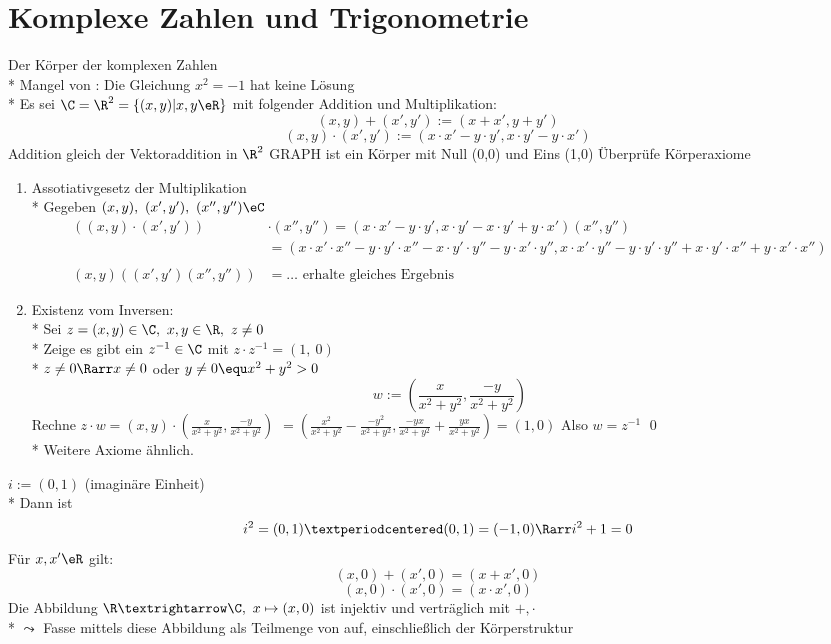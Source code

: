\chapter{Komplexe Zahlen und Trigonometrie}
Der Körper \C{} der komplexen Zahlen\\*
Mangel von \R{}: Die Gleichung $x^2=-1$ hat keine Lösung\\*
Es sei $\C=\R^2=\{(x,y)|x,y\eR\}$ mit folgender Addition und Multiplikation:
$$(x,y)+(x',y'):=(x+x',y+y')$$
$$(x,y)·(x',y'):=(x·x'-y·y',x·y'-y·x')$$
Addition gleich der Vektoraddition in $\R^2$ GRAPH
\C{} ist ein Körper mit Null (0,0) und Eins (1,0)
\bew
Überprüfe Körperaxiome
\begin{enumerate}
\item{Assotiativgesetz der Multiplikation\\*
Gegeben $(x,y),\ (x',y'),\ (x'',y'')\eC$
\begin{align*}
((x,y)·(x',y'))&·(x'',y'')=(x·x'-y·y',x·y'-x·y'+y·x')(x'',y'')\\
&=(x·x'·x''-y·y'·x''-x·y'·y''-y·x'·y'',x·x'·y''-y·y'·y''+x·y'·x''+y·x'·x'')\\ \\
(x,y)((x',y')(x'',y''))&=…\text{ erhalte gleiches Ergebnis}
\end{align*}}

\item{Existenz vom Inversen:\\*
Sei $z = (x, y) \in \C, \ x, y \in \R, \ z \neq 0$ \\*
Zeige es gibt ein $z^{-1} \in \C$ mit $z \cdot z^{-1} = (1,\ 0)$\\*
$z \neq 0 \Rarr x \neq 0$ oder $y \neq 0 \equ x^2 + y^2 > 0$\\
$$w:= \left(\frac{x}{x^2 + y^2}, \frac{-y}{x^2 + y^2}\right)$$
Rechne $z \cdot w = (x, y) \cdot \left(\frac{x}{x^2 + y^2}, \frac{-y}{x^2 + y^2}\right)$
$=\left(\frac{x^2}{x^2 + y^2} - \frac{-y^2}{x^2 + y^2}, \frac{-yx}{x^2 + y^2} + \frac{yx}{x^2 + y^2}\right) = (1, 0)$
Also $w = z^{-1}$ \qed \\*
Weitere Axiome ähnlich.}
\end{enumerate}
$i:=(0,1)$ (imaginäre Einheit)\\*
Dann ist $$i^2=(0,1)·(0,1)=(-1,0) \Rarr i^2+1=0$$
\bem
Für $x,x'\eR$ gilt:
$$(x,0)+(x',0)=(x+x',0)$$
$$(x,0)·(x',0)=(x·x',0)$$
Die Abbildung $\R→\C,\ x\mapsto(x,0)$ ist injektiv und verträglich mit $+,·$\\*
$\leadsto$ Fasse \R{} mittels diese Abbildung als Teilmenge von \C{} auf, einschließlich der Körperstruktur\\
